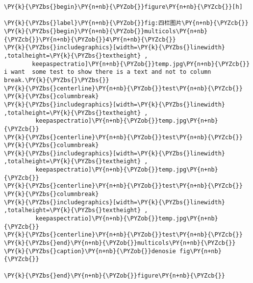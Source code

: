 \begin{Verbatim}[commandchars=\\\{\}]
\PY{k}{\PYZbs{}begin}\PY{n+nb}{\PYZob{}}figure\PY{n+nb}{\PYZcb{}}[h]

\PY{k}{\PYZbs{}label}\PY{n+nb}{\PYZob{}}fig:四栏图片\PY{n+nb}{\PYZcb{}}
\PY{k}{\PYZbs{}begin}\PY{n+nb}{\PYZob{}}multicols\PY{n+nb}{\PYZcb{}}\PY{n+nb}{\PYZob{}}4\PY{n+nb}{\PYZcb{}}
\PY{k}{\PYZbs{}includegraphics}[width=\PY{k}{\PYZbs{}linewidth} ,totalheight=\PY{k}{\PYZbs{}textheight} ,
        keepaspectratio]\PY{n+nb}{\PYZob{}}temp.jpg\PY{n+nb}{\PYZcb{}}
i want  some test to show there is a text and not to column break.\PY{k}{\PYZbs{}\PYZbs{}}
\PY{k}{\PYZbs{}centerline}\PY{n+nb}{\PYZob{}}test\PY{n+nb}{\PYZcb{}}
\PY{k}{\PYZbs{}columnbreak}
\PY{k}{\PYZbs{}includegraphics}[width=\PY{k}{\PYZbs{}linewidth} ,totalheight=\PY{k}{\PYZbs{}textheight} ,
         keepaspectratio]\PY{n+nb}{\PYZob{}}temp.jpg\PY{n+nb}{\PYZcb{}}
\PY{k}{\PYZbs{}centerline}\PY{n+nb}{\PYZob{}}test\PY{n+nb}{\PYZcb{}}
\PY{k}{\PYZbs{}columnbreak}
\PY{k}{\PYZbs{}includegraphics}[width=\PY{k}{\PYZbs{}linewidth} ,totalheight=\PY{k}{\PYZbs{}textheight} ,
         keepaspectratio]\PY{n+nb}{\PYZob{}}temp.jpg\PY{n+nb}{\PYZcb{}}
\PY{k}{\PYZbs{}centerline}\PY{n+nb}{\PYZob{}}test\PY{n+nb}{\PYZcb{}}
\PY{k}{\PYZbs{}columnbreak}
\PY{k}{\PYZbs{}includegraphics}[width=\PY{k}{\PYZbs{}linewidth} ,totalheight=\PY{k}{\PYZbs{}textheight} ,
         keepaspectratio]\PY{n+nb}{\PYZob{}}temp.jpg\PY{n+nb}{\PYZcb{}}
\PY{k}{\PYZbs{}centerline}\PY{n+nb}{\PYZob{}}test\PY{n+nb}{\PYZcb{}}
\PY{k}{\PYZbs{}end}\PY{n+nb}{\PYZob{}}multicols\PY{n+nb}{\PYZcb{}}
\PY{k}{\PYZbs{}caption}\PY{n+nb}{\PYZob{}}denosie fig\PY{n+nb}{\PYZcb{}}

\PY{k}{\PYZbs{}end}\PY{n+nb}{\PYZob{}}figure\PY{n+nb}{\PYZcb{}}
\end{Verbatim}
